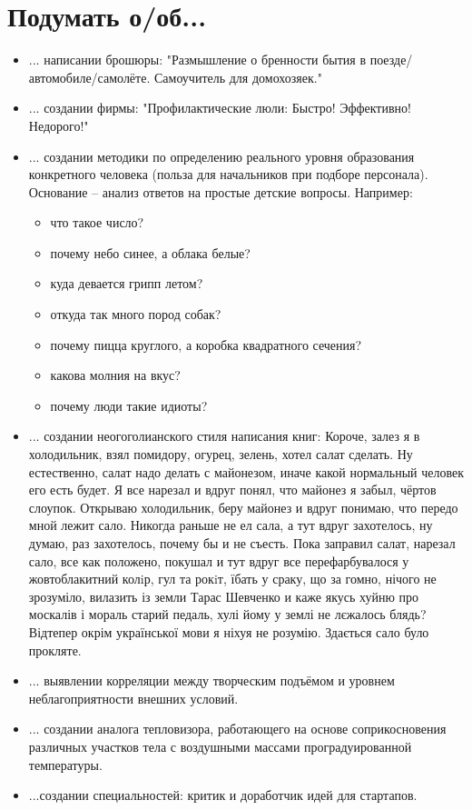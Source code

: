 \section{Подумать о/об...}
\begin{itemize}
\item ... написании брошюры: "Размышление о бренности бытия в поезде/автомобиле/самолёте. Самоучитель для домохозяек."
\item ... создании фирмы: "Профилактические люли: Быстро! Эффективно! Недорого!"
\item ...  создании методики по определению реального уровня образования конкретного человека (польза для начальников при подборе персонала). Основание -- анализ ответов на простые детские вопросы.
Например:
    \begin{itemize}
        \item что такое число?
        \item почему небо синее, а облака белые?
        \item куда девается грипп летом?
        \item откуда так много пород собак?
        \item почему пицца круглого, а коробка квадратного сечения?
        \item какова молния на вкус?
        \item почему люди такие идиоты?
    \end{itemize}
\item ... создании неогоголианского стиля написания книг:
    Короче, залез я в холодильник, взял помидору, огурец, зелень, хотел салат сделать. Ну естественно, салат надо делать с майонезом, иначе
    какой нормальный человек его есть будет. Я все нарезал и вдруг понял, что майонез я забыл, чёртов слоупок. Открываю холодильник, беру
    майонез и вдруг понимаю, что передо мной лежит сало. Никогда раньше не ел сала, а тут вдруг захотелось, ну думаю, раз захотелось, почему
    бы и не съесть. Пока заправил салат, нарезал сало, все как положено, покушал и тут вдруг все перефарбувалося у жовтоблакитний колiр, гул
    та рокiт, їбать у сраку, що за гомно, нічого не зрозуміло, вилазить із земли Тарас Шевченко и каже якусь хуйню про москалів і мораль
    старий педаль, хулі йому у землі не лєжалось блядь? Відтепер окрім української мови я ніхуя не розумію. Здається сало було прокляте.
\item ... выявлении корреляции между творческим подъёмом и уровнем неблагоприятности внешних условий.
\item ... создании аналога тепловизора, работающего на основе соприкосновения различных участков тела с воздушными массами проградуированной температуры.
\item ...создании специальностей: критик и доработчик идей для стартапов.
\end{itemize}

